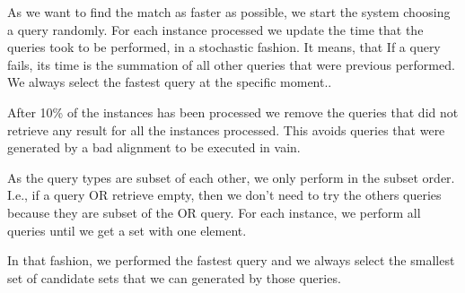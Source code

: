 As we want to find the match as faster as possible, we start the system choosing a query randomly. 
For each instance processed we update the time that the queries took to be performed, in a stochastic fashion. It means, that If a query fails, its time is the summation of all other queries that were previous performed. We always select the fastest query at the specific moment.. 

After 10\% of the instances has been processed we remove the queries that did not retrieve any result for all the instances processed. This avoids queries that were generated by a bad alignment to be executed in vain.

As the query types are subset of each other, we only perform in the subset order.  I.e., if a query OR retrieve empty, then we don't need to try the others queries because they are subset of the OR query. For each instance, we perform all queries until we get a set with one element.

In that fashion, we performed the fastest query and we always select the smallest set of candidate sets that we can generated by those queries. 
